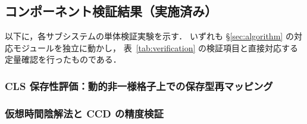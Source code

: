 %

\subsection{コンポーネント検証結果（実施済み）}
\label{sec:component_verification}

以下に，各サブシステムの単体検証実験を示す．
いずれも §\ref{sec:algorithm} の対応モジュールを独立に動かし，
表~\ref{tab:verification} の検証項目と直接対応する定量確認を行ったものである．

\subsubsection{CLS 保存性評価：動的非一様格子上での保存型再マッピング}
\label{app:cls_conservation}


\subsubsection{仮想時間陰解法と CCD の精度検証}
\label{app:ccd_pseudotime}


